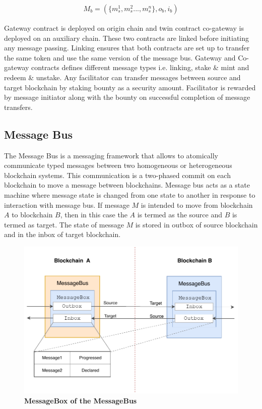 \documentclass[12pt,a4paper]{article}
\begin{document}
\begin{align}
  M_b  = (\{ m^1_s,m^2_s ... ,m^n_s \}, o_b, i_b)
\end{align}


Gateway contract is deployed on origin chain and twin contract co-gateway is deployed on an auxiliary chain. 
These two contracts are linked before initiating any message passing. 
Linking ensures that both contracts are set up to transfer the same token and use the same version of the message bus. 
Gateway and Co-gateway contracts defines different message types i.e. linking, stake \& mint and redeem \& unstake. 
Any facilitator can transfer messages between source and target blockchain by staking bounty as a security amount. 
Facilitator is rewarded by message initiator along with the bounty on successful completion of message transfers. 
\subsection{Message Bus}\label{gateway:messagebus}
    
The Message Bus is a messaging framework that allows to atomically communicate typed messages between two homogeneous or heterogeneous blockchain systems. 
This communication is a two-phased commit on each blockchain to move a message between blockchains. 
Message bus acts as a state machine where message state is changed from one state to another in response to interaction with message bus. 
If message $M$ is intended to move from blockchain $A$ to blockchain $B$, then in this case the $A$ is termed as the source and $B$ is termed as target.
The state of message $M$ is stored in outbox of source blockchain and in the inbox of target blockchain.
\begin{figure}[htb]
    \centering
	\includegraphics[width=\textwidth]{messagebus}
	\caption{\textbf{MessageBox of the MessageBus}}
	\label{fig:messagebus}
\end{figure}
\end{document}
